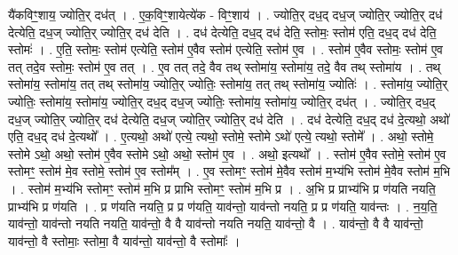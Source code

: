 \documentclass[17pt]{extarticle}
\begin{document}
यै॑कविꣳ॒॒शाय॒ ज्योति॒र् दध॑त् । . ए॒क॒विꣳ॒॒शायेत्ये॑क - विꣳ॒॒शाय॑ । . ज्योति॒र् दध॒द् दध॒ज् ज्योति॒र् ज्योति॒र् दध॑ देत्येति॒ दध॒ज् ज्योति॒र् ज्योति॒र् दध॑ देति । . दध॑ देत्येति॒ दध॒द् दध॑ देति॒ स्तोमः॒ स्तोम॑ एति॒ दध॒द् दध॑ देति॒ स्तोमः॑ । . ए॒ति॒ स्तोमः॒ स्तोम॑ एत्येति॒ स्तोम॑ ए॒वैव स्तोम॑ एत्येति॒ स्तोम॑ ए॒व । . स्तोम॑ ए॒वैव स्तोमः॒ स्तोम॑ ए॒व तत् तदे॒व स्तोमः॒ स्तोम॑ ए॒व तत् । . ए॒व तत् तदे॒ वैव तथ् स्तोमा॑य॒ स्तोमा॑य॒ तदे॒ वैव तथ् स्तोमा॑य । . तथ् स्तोमा॑य॒ स्तोमा॑य॒ तत् तथ् स्तोमा॑य॒ ज्योति॒र् ज्योतिः॒ स्तोमा॑य॒ तत् तथ् स्तोमा॑य॒ ज्योतिः॑ । . स्तोमा॑य॒ ज्योति॒र् ज्योतिः॒ स्तोमा॑य॒ स्तोमा॑य॒ ज्योति॒र् दध॒द् दध॒ज् ज्योतिः॒ स्तोमा॑य॒ स्तोमा॑य॒ ज्योति॒र् दध॑त् । . ज्योति॒र् दध॒द् दध॒ज् ज्योति॒र् ज्योति॒र् दध॑ देत्येति॒ दध॒ज् ज्योति॒र् ज्योति॒र् दध॑ देति । . दध॑ देत्येति॒ दध॒द् दध॑ दे॒त्यथो॒ अथो॑ एति॒ दध॒द् दध॑ दे॒त्यथो᳚ । . ए॒त्यथो॒ अथो॑ एत्ये॒ त्यथो॒ स्तोमे॒ स्तोमे ऽथो॑ एत्ये॒ त्यथो॒ स्तोमे᳚ । . अथो॒ स्तोमे॒ स्तोमे ऽथो॒ अथो॒ स्तोम॑ ए॒वैव स्तोमे ऽथो॒ अथो॒ स्तोम॑ ए॒व । . अथो॒ इत्यथो᳚ । . स्तोम॑ ए॒वैव स्तोमे॒ स्तोम॑ ए॒व स्तोमꣳ॒॒ स्तोम॑ मे॒व स्तोमे॒ स्तोम॑ ए॒व स्तोम᳚म् । . ए॒व स्तोमꣳ॒॒ स्तोम॑ मे॒वैव स्तोम॑ म॒भ्य॑भि स्तोम॑ मे॒वैव स्तोम॑ म॒भि । . स्तोम॑ म॒भ्य॑भि स्तोमꣳ॒॒ स्तोम॑ म॒भि प्र प्राभि स्तोमꣳ॒॒ स्तोम॑ म॒भि प्र । . अ॒भि प्र प्राभ्य॑भि प्र ण॑यति नयति॒ प्राभ्य॑भि प्र ण॑यति । . प्र ण॑यति नयति॒ प्र प्र ण॑यति॒ याव॑न्तो॒ याव॑न्तो नयति॒ प्र प्र ण॑यति॒ याव॑न्तः । . न॒य॒ति॒ याव॑न्तो॒ याव॑न्तो नयति नयति॒ याव॑न्तो॒ वै वै याव॑न्तो नयति नयति॒ याव॑न्तो॒ वै । . याव॑न्तो॒ वै वै याव॑न्तो॒ याव॑न्तो॒ वै स्तोमाः॒ स्तोमा॒ वै याव॑न्तो॒ याव॑न्तो॒ वै स्तोमाः᳚ । \newline
\end{document}
